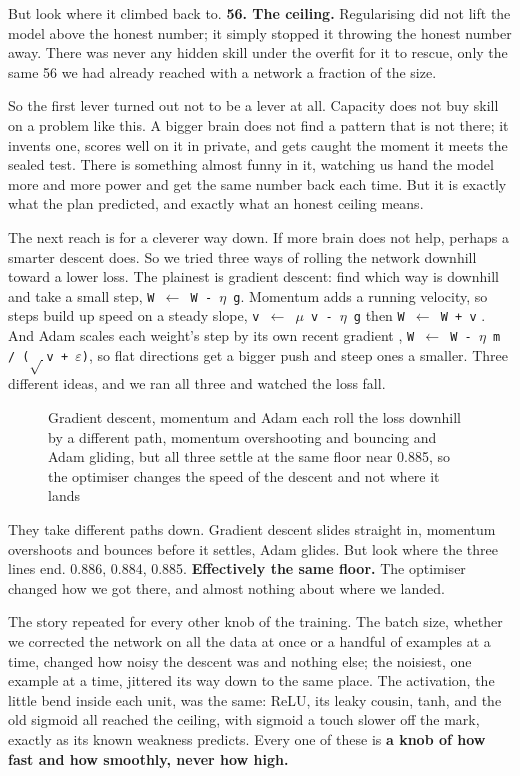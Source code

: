 \documentclass[11pt]{article} %
\begin{document}
But look where it climbed back to. \textbf{56. The ceiling.} Regularising did not lift the model above the honest number; it simply stopped it throwing the honest number away. There was never any hidden skill under the overfit for it to rescue, only the same 56 we had already reached with a network a fraction of the size.

So the first lever turned out not to be a lever at all. Capacity does not buy skill on a problem like this. A bigger brain does not find a pattern that is not there; it invents one, scores well on it in private, and gets caught the moment it meets the sealed test. There is something almost funny in it, watching us hand the model more and more power and get the same number back each time. But it is exactly what the plan predicted, and exactly what an honest ceiling means.

The next reach is for a cleverer way down. If more brain does not help, perhaps a smarter descent does. So we tried three ways of rolling the network downhill toward a lower loss. The plainest is gradient descent: find which way is downhill and take a small step, \texttt{W $\leftarrow$ W - $\eta$ g}. Momentum adds a running velocity, so steps build up speed on a steady slope, \texttt{v $\leftarrow$ $\mu$ v - $\eta$ g} then \texttt{W $\leftarrow$ W + v} \cite{sutskever:2013}. And Adam scales each weight's step by its own recent gradient \cite{kingma:2015}, \texttt{W $\leftarrow$ W - $\eta$ m / ($\sqrt{\,}$v + $\varepsilon$)}, so flat directions get a bigger push and steep ones a smaller. Three different ideas, and we ran all three and watched the loss fall.

\begin{figure}[htbp]
\centering

\caption{Gradient descent, momentum and Adam each roll the loss downhill by a different path, momentum overshooting and bouncing and Adam gliding, but all three settle at the same floor near 0.885, so the optimiser changes the speed of the descent and not where it lands}
\end{figure}


They take different paths down. Gradient descent slides straight in, momentum overshoots and bounces before it settles, Adam glides. But look where the three lines end. 0.886, 0.884, 0.885. \textbf{Effectively the same floor.} The optimiser changed how we got there, and almost nothing about where we landed.

The story repeated for every other knob of the training. The batch size, whether we corrected the network on all the data at once or a handful of examples at a time, changed how noisy the descent was and nothing else; the noisiest, one example at a time, jittered its way down to the same place. The activation, the little bend inside each unit, was the same: ReLU, its leaky cousin, tanh, and the old sigmoid all reached the ceiling, with sigmoid a touch slower off the mark, exactly as its known weakness predicts. Every one of these is \textbf{a knob of how fast and how smoothly, never how high.}
\end{document}
